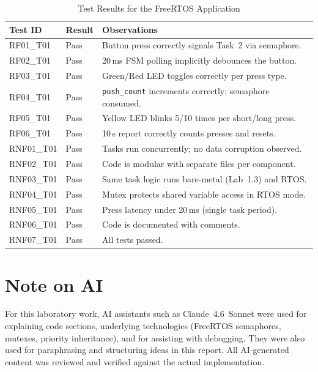 \documentclass[12pt]{article}
\begin{document}
\begin{table}[H]
\centering
\begin{tabular}{@{}llp{7.5cm}@{}}
\toprule
\textbf{Test ID} & \textbf{Result} & \textbf{Observations} \\
\midrule
RF01\_T01  & Pass & Button press correctly signals Task~2 via semaphore. \\
RF02\_T01  & Pass & 20\,ms FSM polling implicitly debounces the button. \\
RF03\_T01  & Pass & Green/Red LED toggles correctly per press type. \\
RF04\_T01  & Pass & \texttt{push\_count} increments correctly; semaphore consumed. \\
RF05\_T01  & Pass & Yellow LED blinks 5/10 times per short/long press. \\
RF06\_T01  & Pass & 10\,s report correctly counts presses and resets. \\
RNF01\_T01 & Pass & Tasks run concurrently; no data corruption observed. \\
RNF02\_T01 & Pass & Code is modular with separate files per component. \\
RNF03\_T01 & Pass & Same task logic runs bare-metal (Lab~1.3) and RTOS. \\
RNF04\_T01 & Pass & Mutex protects shared variable access in RTOS mode. \\
RNF05\_T01 & Pass & Press latency under 20\,ms (single task period). \\
RNF06\_T01 & Pass & Code is documented with comments. \\
RNF07\_T01 & Pass & All tests passed. \\
\bottomrule
\end{tabular}
\caption{Test Results for the FreeRTOS Application}
\label{tab:tests}
\end{table}

\section{Note on AI}

\hspace{0.8cm}
For this laboratory work, AI assistants such as Claude~4.6~Sonnet were used for explaining code sections, underlying technologies (FreeRTOS semaphores, mutexes, priority inheritance), and for assisting with debugging. They were also used for paraphrasing and structuring ideas in this report. All AI-generated content was reviewed and verified against the actual implementation.
\end{document}
